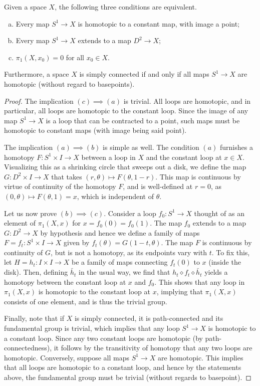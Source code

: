 \documentclass{../../mathnotes}
\begin{document}
\begin{prop}
    Given a space $X$, the following three conditions are equivalent.
    \begin{enumerate}[(a)]
        \item Every map $S^1\to X$ is homotopic to a constant map, with image a point;
        \item Every map $S^1\to X$ extends to a map $D^2\to X$;
        \item $\pi_1(X,x_0)=0$ for all $x_0\in X$.
    \end{enumerate}
    Furthermore, a space $X$ is simply connected if and only if all maps $S^1\to X$ are homotopic
    (without regard to basepoints).
\end{prop}
\begin{proof}
    The implication $(c)\implies (a)$ is trivial. All loops are homotopic, and in particular, all loops
    are homotopic to the constant loop. Since the image of any map $S^1\to X$ is a loop that can be
    contracted to a point, such maps must be homotopic to constant maps (with image being said point).

    The implication $(a)\implies (b)$ is simple as well. The condition $(a)$ furnishes a homotopy 
    $F:S^1\times I\to X$ between a loop in $X$ and the constant loop at $x\in X$. Visualizing this
    as a shrinking circle that sweeps out a disk, we define the map $G:D^2\times I\to X$ that takes
    $(r,\theta)\mapsto F(\theta,1-r)$. This map is continuous by virtue of continuity of the homotopy $F$,
    and is well-defined at $r=0$, as $(0,\theta)\mapsto F(\theta,1)=x$, which is independent of $\theta$.

    Let us now prove $(b)\implies (c)$. Consider a loop $f_0:S^1\to X$ thought of as an element of
    $\pi_1(X,x)$ for $x=f_0(0)=f_0(1)$. The map $f_0$ extends to a map $G:D^2\to X$ by hypothesis
    and hence we define a family of maps $F=f_t:S^1\times I\to X$ given by $f_t(\theta)=G(1-t,\theta)$.
    The map $F$ is continuous by continuity of $G$, but is not a homotopy, as its endpoints vary with $t$.
    To fix this, let $H=h_t:I\times I\to X$ be a family of maps connecting $f_t(0)$ to $x$ (inside the disk).
    Then, defining $\bar h_t$ in the usual way, we find that $h_t\diamond f_t\diamond\bar h_t$ yields
    a homotopy between the constant loop at $x$ and $f_0$. This shows that any loop in $\pi_1(X,x)$ is
    homotopic to the constant loop at $x$, implying that $\pi_1(X,x)$ consists of one element, and is thus
    the trivial group.

    Finally, note that if $X$ is simply connected, it is path-connected and its fundamental group is trivial,
    which implies that any loop $S^1\to X$ is homotopic to a constant loop. Since any two constant loops are homotopic
    (by path-connectedness), it follows by the transitivity of homotopy that any two loops are homotopic.
    Conversely, suppose all maps $S^1\to X$ are homotopic. This implies that all loops are homotopic to a constant loop,
    and hence by the statements above, the fundamental group must be trivial (without regards to basepoint).
\end{proof}
\end{document}
